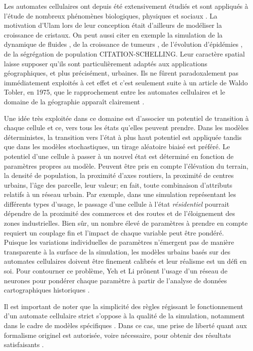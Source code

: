 \documentclass[10pt]{article}
\begin{document}
Les automates cellulaires ont depuis été extensivement étudiés et sont
appliqués à l'étude de nombreux phénomènes biologiques, physiques et
sociaux \cite{Ganguly}. La motivation d'Ulam lors de leur conception
était d'ailleurs de modéliser la croissance de cristaux. On peut aussi
citer en exemple la simulation de la dynamique de fluides
\cite{Frisch1986}, de la croissance de tumeurs \cite{Kansal2000}, de
l'évolution d'épidémies \cite{Fu2003}, de la ségrégation de population
CITATION-SCHELLING. Leur caractère spatial laisse supposer qu'ils sont
particulièrement adaptés aux applications géographiques, et plus
précisément, urbaines. Ils ne fûrent paradoxalement pas immédiatement
exploités à cet effet et c'est seulement suite à un article de Waldo
Tobler, en 1975, que le rapprochement entre les automates cellulaires
et le domaine de la géographie apparaît clairement \cite{Tobler1975}.

Une idée très exploitée dans ce domaine est d'associer un potentiel de
transition à chaque cellule et ce, vers tous les états qu'elles
peuvent prendre. Dans les modèles déterministes, la transition vers
l'état à plus haut potentiel est appliquée tandis que dans les modèles
stochastiques, un tirage aléatoire biaisé est préféré. Le potentiel
d'une cellule à passer à un nouvel état est déterminé en fonction de
paramètres propres au modèle. Peuvent être pris en compte l'élévation
du terrain, la densité de population, la proximité d'axes routiers, la
proximité de centres urbains, l'âge des parcelle, leur valeur; en
fait, toute combinaison d'attributs relatifs à un réseau urbain. Par
exemple, dans une simulation représentant les différents types
d'usage, le passage d'une cellule à l'état \textit{résidentiel}
pourrait dépendre de la proximité des commerces et des routes et de
l'éloignement des zones industrielles. Bien sûr, un nombre élevé de
paramètres à prendre en compte requiert un couplage fin et l'impact de
chaque variable peut être pondéré. Puisque les variations
individuelles de paramètres n'émergent pas de manière transparente à
la surface de la simulation, les modèles urbains basés sur des
automates cellulaires doivent être finement calibrés et leur réalisme
est un défi en soi. Pour contourner ce problème, Yeh et Li prônent
l'usage d'un réseau de neurones pour pondérer chaque paramètre à
partir de l'analyse de données cartographiques historiques
\cite{Yeh2002}.

Il est important de noter que la simplicité des règles régissant le
fonctionnement d'un automate cellulaire strict s'oppose à la qualité
de la simulation, notamment dans le cadre de modèles spécifiques
\cite{Torrens2001}. Dans ce cas, une prise de liberté quant aux
formalisme originel est autorisée, voire nécessaire, pour obtenir des
résultats satisfaisants \cite{White1998}.
\end{document}
